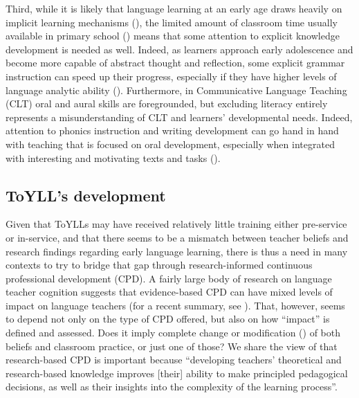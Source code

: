 \documentclass[output=paper]{langscibook}
\begin{document}
Third, while it is likely that language learning at an early age draws heavily on implicit learning mechanisms (\citealt{DeKeyser2003}), the limited amount of classroom time usually available in primary school (\citealt{GrahamEtAl2017}) means that some attention to explicit knowledge development is needed as well. Indeed, as learners approach early adolescence and become more capable of abstract thought and reflection, some explicit grammar instruction can speed up their progress, especially if they have higher levels of language analytic ability (\citealt{KasprowiczEtAl2019,Roehr-BrackinTellier2019}). Furthermore,  in Communicative Language Teaching (CLT) oral and aural skills are foregrounded, but excluding literacy entirely represents a misunderstanding of CLT and learners’ developmental needs. Indeed, attention to phonics instruction and writing development can go hand in hand with teaching that is focused on oral development, especially when integrated with interesting and motivating texts and tasks (\citealt{Porter2020}).

\subsection{ToYLL's development}\label{sec:porter:1.2}

Given that ToYLLs may have received relatively little training either pre-service or in-service, and that there seems to be a mismatch between teacher beliefs and research findings regarding early language learning, there is thus a need in many contexts to try to bridge that gap through research-informed continuous professional development (CPD). A fairly large body of research on language teacher cognition suggests that evidence-based CPD can have mixed levels of impact on language teachers (for a recent summary, see \citealt{MacaroEtAl2015}). That, however, seems to depend not only on the type of CPD offered, but also on how ``impact'' is defined and assessed. Does it imply complete change or modification (\citealt{CabarogluRoberts2000}) of both beliefs and classroom practice, or just one of those? We share the view of \citet[129]{MacaroEtAl2015} that research-based CPD is important because ``developing teachers’ theoretical and research-based knowledge improves [their] ability to make principled pedagogical decisions, as well as their insights into the complexity of the learning process''.
\end{document}

